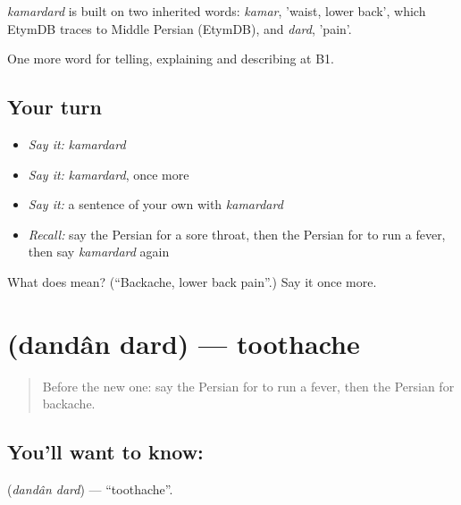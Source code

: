 \begin{cousinweb}
\emph{kamardard} is built on two inherited words: \emph{kamar}, 'waist, lower back', which EtymDB traces to Middle Persian (EtymDB), and \emph{dard}, 'pain'.
\end{cousinweb}

\begin{grammarlens}[title={What you've built}]
One more word for telling, explaining and describing at B1.
\end{grammarlens}

\subsection*{Your turn}
\begin{itemize}
\raggedright
  \item \emph{Say it:} \emph{kamardard}
  \item \emph{Say it:} \emph{kamardard}, once more
  \item \emph{Say it:} a sentence of your own with \emph{kamardard}
  \item \emph{Recall:} say the Persian for a sore throat, then the Persian for to run a fever, then say \emph{kamardard} again
\end{itemize}

\begin{tcolorbox}[breakable,colback=teal!4,colframe=teal!35!black,title={Before you move on}]
What does  mean? (\textquotedblleft{}Backache, lower back pain\textquotedblright{}.) Say it once more.
\end{tcolorbox}
\section[\texorpdfstring{\fa{دندان} \fa{درد} (dandân dard)}{دندان درد (dandân dard)}]{  (dandân dard) — toothache}

\label{lesson:FA-C491-dandan-dard}



\begin{quote}
Before the new one: say the Persian for to run a fever, then the Persian for backache.
\end{quote}

\subsection*{You'll want to know:  }
\textbf{ } (\emph{dandân dard}) — \textquotedblleft{}toothache\textquotedblright{}.

